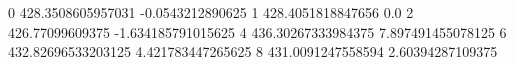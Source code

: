 0 428.3508605957031 -0.0543212890625
1 428.4051818847656 0.0
2 426.77099609375 -1.634185791015625
4 436.30267333984375 7.897491455078125
6 432.82696533203125 4.421783447265625
8 431.0091247558594 2.60394287109375

